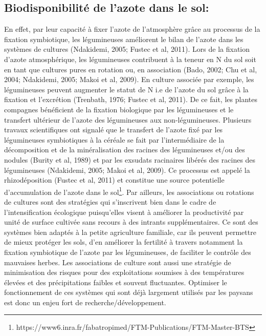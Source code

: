 \documentclass[a4paper,11pt]{article}
\begin{document}
\subsection{Biodisponibilité de l’azote dans le sol:}

En effet, par leur capacité à fixer l’azote de l’atmosphère grâce au
processus de la fixation symbiotique, les légumineuses améliorent le
bilan de l’azote dans les systèmes de cultures (Ndakidemi, 2005;
Fustec et al, 2011). Lors de la fixation d’azote atmosphérique, les
légumineuses contribuent à la teneur en N du sol soit en tant que
cultures pures en rotation ou, en association (Bado, 2002; Chu et al,
2004; Ndakidemi, 2005; Makoi et al, 2009). En culture associée par
exemple, les légumineuses peuvent augmenter le statut de N i.e de
l’azote du sol grâce à la fixation et l’excrétion (Trenbath, 1976;
Fustec et al, 2011). De ce fait, les plantes compagnes bénéficient de
la fixation biologique par les légumineuses et le transfert ultérieur
de l’azote des légumineuses aux non-légumineuses. Plusieurs travaux
scientifiques ont signalé que le transfert de l’azote fixé par les
légumineuses symbiotiques à la céréale se fait par l’intermédiaire de
la décomposition et de la minéralisation des racines des légumineuses
et/ou des nodules (Burity et al, 1989) et par les exsudats racinaires
libérés des racines des légumineuses (Ndakidemi, 2005; Makoi et al,
2009). Ce processus est appelé la rhizodéposition (Fustec et al, 2011)
et constitue une source potentielle d’accumulation de l’azote dans le
sol\footnote{https://www6.inra.fr/fabatropimed/FTM-Publications/FTM-Master-BTS}.
Par ailleurs, les associations ou rotations de cultures sont
des stratégies qui s’inscrivent bien dans le cadre de
l’intensification écologique puisqu’elles visent à améliorer la
productivité par unité de surface cultivée sans recours à des intrants
supplémentaires. Ce sont des systèmes bien adaptés à la petite
agriculture familiale, car ils peuvent permettre de mieux protéger les
sols, d’en améliorer la fertilité à travers notamment la fixation
symbiotique de l’azote par les légumineuses, de faciliter le contrôle
des mauvaises herbes. Les associations de culture sont aussi une
stratégie de minimisation des risques pour des exploitations soumises
à des températures élevées et des précipitations faibles et souvent
fluctuantes. Optimiser le fonctionnement de ces systèmes qui sont déjà
largement utilisés par les paysans est donc un enjeu fort de
recherche/développement.

\newpage

 
  
\end{document}
